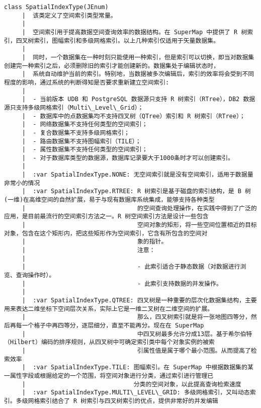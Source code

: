 \documentclass[11pt]{article}
\begin{document}
\begin{Verbatim}[commandchars=\\\{\}]
    class SpatialIndexType(JEnum)
     |  该类定义了空间索引类型常量。
     |  
     |  空间索引用于提高数据空间查询效率的数据结构。在 SuperMap 中提供了 R 树索引，四叉树索引，图幅索引和多级网格索引。以上几种索引仅适用于矢量数据集。
     |  
     |  同时，一个数据集在一种时刻只能使用一种索引，但是索引可以切换，即当对数据集创建完一种索引之后，必须删除旧的索引才能创建新的。数据集处于编辑状态时，
     |  系统自动维护当前的索引。特别地，当数据被多次编辑后，索引的效率将会受到不同程度的影响，通过系统的判断得知是否要求重新建立空间索引:
     |  
     |  - 当前版本 UDB 和 PostgreSQL 数据源只支持 R 树索引（RTree），DB2 数据源只支持多级网格索引（Multi\_Level\_Grid）；
     |  - 数据库中的点数据集均不支持四叉树（QTree）索引和 R 树索引（RTree）；
     |  - 网络数据集不支持任何类型的空间索引；
     |  - 复合数据集不支持多级网格索引；
     |  - 路由数据集不支持图幅索引（TILE）；
     |  - 属性数据集不支持任何类型的空间索引；
     |  - 对于数据库类型的数据源，数据库记录要大于1000条时才可以创建索引。
     |  
     |  :var SpatialIndexType.NONE: 无空间索引就是没有空间索引，适用于数据量非常小的情况
     |  :var SpatialIndexType.RTREE: R 树索引是基于磁盘的索引结构，是 B 树(一维)在高维空间的自然扩展，易于与现有数据库系统集成，能够支持各种类型
     |                               的空间查询处理操作，在实践中得到了广泛的应用，是目前最流行的空间索引方法之一。R 树空间索引方法是设计一些包含
     |                               空间对象的矩形，将一些空间位置相近的目标对象，包含在这个矩形内，把这些矩形作为空间索引，它含有所包含的空间对
     |                               象的指针。
     |                               注意：
     |  
     |                               - 此索引适合于静态数据（对数据进行浏览、查询操作时）。
     |                               - 此索引支持数据的并发操作。
     |  
     |  :var SpatialIndexType.QTREE: 四叉树是一种重要的层次化数据集结构，主要用来表达二维坐标下空间层次关系，实际上它是一维二叉树在二维空间的扩展。
     |                               那么，四叉树索引就是将一张地图四等分，然后再每一个格子中再四等分，逐层细分，直至不能再分。现在在 SuperMap
     |                               中四叉树最多允许分成13层。基于希尔伯特（Hilbert）编码的排序规则，从四叉树中可确定索引类中每个对象实例的被索
     |                               引属性值是属于哪个最小范围。从而提高了检索效率
     |  :var SpatialIndexType.TILE: 图幅索引。在 SuperMap 中根据数据集的某一属性字段或根据给定的一个范围，将空间对象进行分类，通过索引进行管理已
     |                              分类的空间对象，以此提高查询检索速度
     |  :var SpatialIndexType.MULTI\_LEVEL\_GRID: 多级网格索引，又叫动态索引。多级网格索引结合了 R 树索引与四叉树索引的优点，提供非常好的并发编辑

\end{Verbatim}
\end{document}
